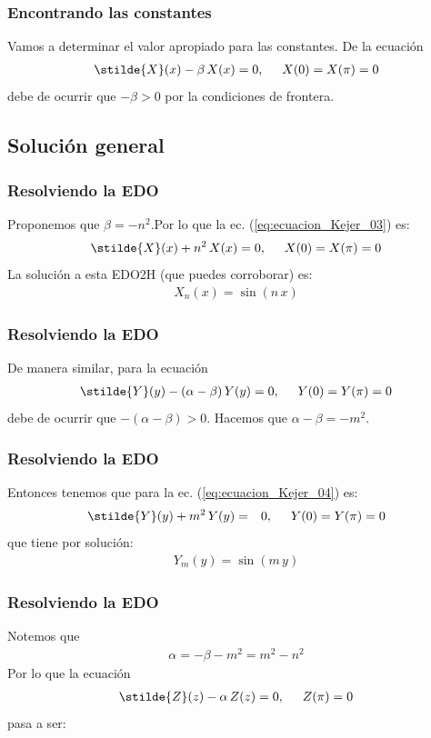 \begin{frame}
\frametitle{Encontrando las constantes}
Vamos a determinar el valor apropiado para las constantes. \pause De la ecuación
\begin{align*}
\stilde{X} (x) - \beta \, X(x) = 0, \hspace{0.5cm} X(0) = X(\pi) = 0
\end{align*}
debe de ocurrir que $-\beta > 0$ por la condiciones de frontera.
\end{frame}
\subsection{Solución general}
\begin{frame}
\frametitle{Resolviendo la EDO}
Proponemos que $\beta = - n^{2}$.\pause  Por lo que la ec. (\ref{eq:ecuacion_Kejer_03}) es:
\begin{align*}
\stilde{X} (x) + n^{2} \, X(x) = 0, \hspace{0.5cm} X(0) = X(\pi) = 0
\end{align*}
\pause
La solución a esta EDO2H (que puedes corroborar) es:
\begin{align*}
X_{n} (x) =  \sin (n \, x)
\end{align*}
\end{frame}
\begin{frame}
\frametitle{Resolviendo la EDO}
De manera similar, para la ecuación
\begin{align*}
\stilde{Y} (y) - (\alpha - \beta) \, Y(y) = 0, \hspace{0.5cm} Y(0) = Y(\pi) = 0
\end{align*}
\pause
debe de ocurrir que $-(\alpha - \beta) > 0$. \pause Hacemos que $\alpha - \beta = - m^{2}$.
\end{frame}
\begin{frame}
\frametitle{Resolviendo la EDO}
Entonces tenemos que para la ec. (\ref{eq:ecuacion_Kejer_04}) es:
\begin{align*}
\stilde{Y} (y) + m^{2} \, Y(y) &=& 0, \hspace{0.5cm} Y(0) = Y(\pi) = 0
\end{align*}
\pause
que tiene por solución:
\begin{align*}
Y_{m} (y) = \sin (m \, y)
\end{align*}
\end{frame}
\begin{frame}
\frametitle{Resolviendo la EDO}
Notemos que
\begin{align*}
\alpha = - \beta - m^{2} = m^{2} - n^{2}
\end{align*}
\pause
Por lo que la ecuación
\begin{align*}
\stilde{Z} (z) - \alpha \, Z(z) = 0, \hspace{0.5cm} Z(\pi) = 0
\end{align*}
pasa a ser:
\end{frame}
